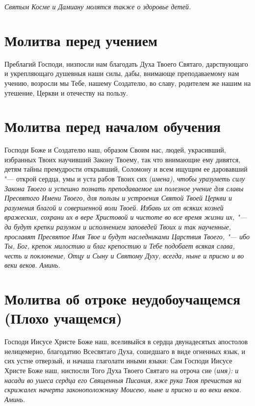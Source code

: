 \itshape Святым Косме и Дамиану молятся также о здоровье детей.\normalfont{} 

 

\mychapterending


  

\section{Молитва перед учением}
 


Преблагий Господи, низпосли нам благодать Духа Твоего Святаго, дарствующаго и укрепляющаго душевныя наши силы, дабы, внимающе преподаваемому нам учению, возросли мы Тебе, нашему Создателю, во славу, родителем же нашим на утешение, Церкви и отечеству на пользу.


\section{Молитва перед началом обучения}
 


Господи Боже и Создателю наш, образом Своим нас, людей, украсивший, избранных Твоих научивший Закону Твоему, так что внимающие ему дивятся, детям тайны премудрости открывший, Соломону и всем ищущим ее даровавший "--- открой сердца, умы и уста рабов Твоих сих (\itshape имена\normalfont{}), чтобы уразуметь силу Закона Твоего и успешно познать преподаваемое им полезное учение для славы Пресвятого Имени Твоего, для пользы и устроения Святой Твоей Церкви и разумения благой и совершенной воли Твоей. Избавь их от всяких козней вражеских, сохрани их в вере Христовой и чистоте во все время жизни их, "--- да будут крепки разумом и исполнением заповедей Твоих и так наученные, прославят Пресвятое Имя Твое и будут наследниками Царствия Твоего, "--- ибо Ты, Бог, крепок милостию и благ крепостию и Тебе подобает всякая слава, честь и поклонение, Отцу и Сыну и Святому Духу, всегда, ныне и присно и во веки веков. Аминь.


\section{Молитва об отроке неудобоучащемся (Плохо учащемся)}
 
Господи Иисусе Христе Боже наш, вселивыйся в сердца двунадесятых апостолов нелицемерно, благодатию Всесвятаго Духа, сошедшаго в виде огненных язык, и сих устне отверзый, и начаша глаголати иными языки: Сам Господи Иисусе Христе Боже наш, ниспосли Того Духа Твоего Святаго на отроча сие (\itshape имя\normalfont{}): и насади во ушеса сердца его Священныя Писания, яже рука Твоя пречистая на скрижалех начерта законоположнику Моисею, ныне и присно и во веки веков. Аминь.

